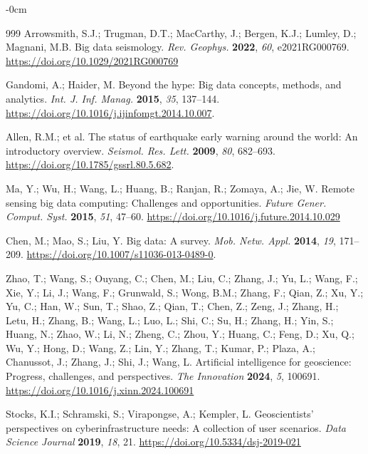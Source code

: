 \documentclass[data,article,accept,pdftex,moreauthors]{Definitions/mdpi}
\begin{document}
\begin{adjustwidth}{-\extralength}{0cm}
\begin{thebibliography}{999}
Arrowsmith, S.J.; Trugman, D.T.; MacCarthy, J.; Bergen, K.J.; Lumley, D.; Magnani, M.B. Big data seismology. \emph{Rev. Geophys.} \textbf{2022}, \emph{60}, e2021RG000769. \url{https://doi.org/10.1029/2021RG000769}

Gandomi, A.; Haider, M. Beyond the hype: Big data concepts, methods, and analytics. \emph{Int. J. Inf. Manag.} \textbf{2015}, \emph{35}, 137--144. \url{https://doi.org/10.1016/j.ijinfomgt.2014.10.007}.

Allen, R.M.; et al. The status of earthquake early warning around the world: An introductory overview. \emph{Seismol. Res. Lett.} \textbf{2009}, \emph{80}, 682--693. \url{https://doi.org/10.1785/gssrl.80.5.682}.

Ma, Y.; Wu, H.; Wang, L.; Huang, B.; Ranjan, R.; Zomaya, A.; Jie, W. Remote sensing big data computing: Challenges and opportunities. \emph{Future Gener. Comput. Syst.} \textbf{2015}, \emph{51}, 47--60. \url{https://doi.org/10.1016/j.future.2014.10.029}

Chen, M.; Mao, S.; Liu, Y. Big data: A survey. \emph{Mob. Netw. Appl.} \textbf{2014}, \emph{19}, 171--209. \url{https://doi.org/10.1007/s11036-013-0489-0}.

Zhao, T.; Wang, S.; Ouyang, C.; Chen, M.; Liu, C.; Zhang, J.; Yu, L.; Wang, F.; Xie, Y.; Li, J.; Wang, F.; Grunwald, S.; Wong, B.M.; Zhang, F.; Qian, Z.; Xu, Y.; Yu, C.; Han, W.; Sun, T.; Shao, Z.; Qian, T.; Chen, Z.; Zeng, J.; Zhang, H.; Letu, H.; Zhang, B.; Wang, L.; Luo, L.; Shi, C.; Su, H.; Zhang, H.; Yin, S.; Huang, N.; Zhao, W.; Li, N.; Zheng, C.; Zhou, Y.; Huang, C.; Feng, D.; Xu, Q.; Wu, Y.; Hong, D.; Wang, Z.; Lin, Y.; Zhang, T.; Kumar, P.; Plaza, A.; Chanussot, J.; Zhang, J.; Shi, J.; Wang, L. Artificial intelligence for geoscience: Progress, challenges, and perspectives. \emph{The Innovation} \textbf{2024}, \emph{5}, 100691. \url{https://doi.org/10.1016/j.xinn.2024.100691}%

Stocks, K.I.; Schramski, S.; Virapongse, A.; Kempler, L. Geoscientists' perspectives on cyberinfrastructure needs: A collection of user scenarios. \emph{Data Science Journal} \textbf{2019}, \emph{18}, 21. \url{https://doi.org/10.5334/dsj-2019-021}


\end{thebibliography}
\end{adjustwidth}
\end{document}
